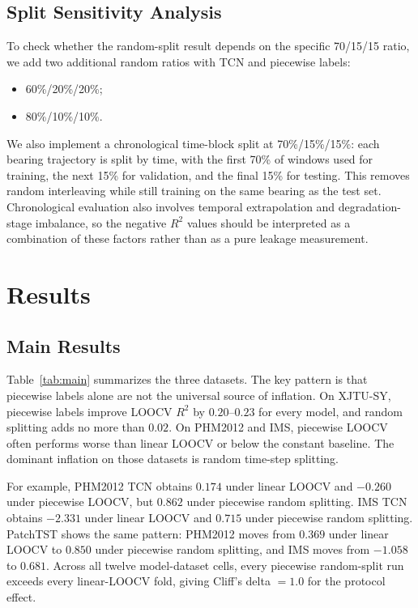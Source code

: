 \documentclass[5p,twocolumn]{elsarticle}
\begin{document}
\subsection{Split Sensitivity Analysis}
To check whether the random-split result depends on the specific 70/15/15 ratio, we add two additional random ratios with TCN and piecewise labels:
\begin{itemize}
    \item 60\%/20\%/20\%;
    \item 80\%/10\%/10\%.
\end{itemize}
We also implement a chronological time-block split at 70\%/15\%/15\%: each bearing trajectory is split by time, with the first 70\% of windows used for training, the next 15\% for validation, and the final 15\% for testing. This removes random interleaving while still training on the same bearing as the test set. Chronological evaluation also involves temporal extrapolation and degradation-stage imbalance, so the negative $R^2$ values should be interpreted as a combination of these factors rather than as a pure leakage measurement.

\section{Results}
\subsection{Main Results}
Table~\ref{tab:main} summarizes the three datasets. The key pattern is that piecewise labels alone are not the universal source of inflation. On XJTU-SY, piecewise labels improve LOOCV $R^2$ by $0.20$--$0.23$ for every model, and random splitting adds no more than $0.02$. On PHM2012 and IMS, piecewise LOOCV often performs worse than linear LOOCV or below the constant baseline. The dominant inflation on those datasets is random time-step splitting.

For example, PHM2012 TCN obtains $0.174$ under linear LOOCV and $-0.260$ under piecewise LOOCV, but $0.862$ under piecewise random splitting. IMS TCN obtains $-2.331$ under linear LOOCV and $0.715$ under piecewise random splitting. PatchTST shows the same pattern: PHM2012 moves from $0.369$ under linear LOOCV to $0.850$ under piecewise random splitting, and IMS moves from $-1.058$ to $0.681$. Across all twelve model-dataset cells, every piecewise random-split run exceeds every linear-LOOCV fold, giving Cliff's delta $=1.0$ for the protocol effect.
\end{document}
